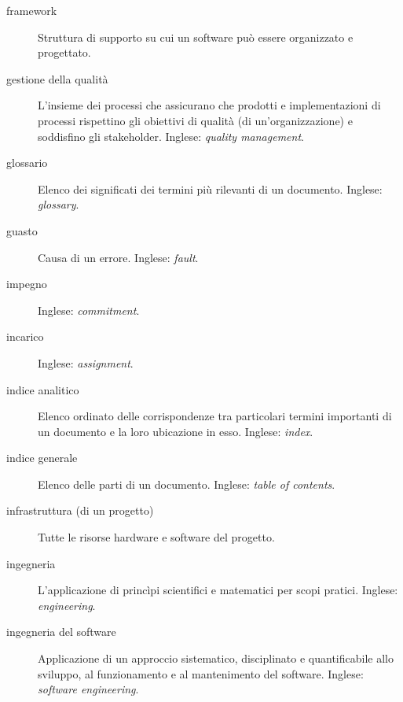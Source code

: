 \documentclass[a4paper]{article}
\begin{document}
\begin{description}
	\item[framework] 

			Struttura di supporto su cui un software può essere organizzato e progettato.
			
	\item[gestione della qualità] 

			L'insieme dei processi che assicurano che prodotti e implementazioni di processi rispettino gli obiettivi di qualità (di un'organizzazione) e soddisfino gli stakeholder. Inglese: \emph{quality management}.
			
	\item[glossario] 

			Elenco dei significati dei termini più rilevanti di un documento. Inglese: \emph{glossary}.
			
	\item[guasto] 

			Causa di un errore. Inglese: \emph{fault}.
			
	\item[impegno] 

			 Inglese: \emph{commitment}.
			
	\item[incarico] 

			 Inglese: \emph{assignment}.
			
	\item[indice analitico] 

			Elenco ordinato delle corrispondenze tra particolari termini importanti di un documento e la loro ubicazione in esso. Inglese: \emph{index}.
			
	\item[indice generale] 

			Elenco delle parti di un documento. Inglese: \emph{table of contents}.
			
	\item[infrastruttura (di un progetto)] 

			Tutte le risorse hardware e software del progetto.
			
	\item[ingegneria] 

			L'applicazione di princìpi scientifici e matematici per scopi pratici. Inglese: \emph{engineering}.
			
	\item[ingegneria del software] 

			Applicazione di un approccio sistematico, disciplinato e quantificabile allo sviluppo, al funzionamento e al mantenimento del software. Inglese: \emph{software engineering}.
			

\end{description}
\end{document}
